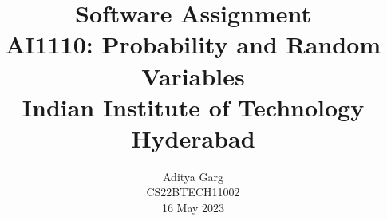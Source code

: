 \documentclass[journal,12pt,twocolumn]{IEEEtran}
\providecommand{\pr}[1]{\ensuremath{\Pr\left(#1\right)}}
\providecommand{\cbrak}[1]{\ensuremath{\left\{#1\right\}}}
\begin{document}
\newtheorem{theorem}{Theorem}[section]
\newtheorem{problem}{Problem}
\newtheorem{proposition}{Proposition}[section]
\newtheorem{lemma}{Lemma}[section]
\newtheorem{corollary}[theorem]{Corollary}
\newtheorem{example}{Example}[section]
\newtheorem{definition}[problem]{Definition}
\newcommand{\BEQA}{\begin{eqnarray}}
\newcommand{\EEQA}{\end{eqnarray}}
\newcommand{\define}{\stackrel{\triangle}{=}}



\providecommand{\mbf}{\mathbf}
\providecommand{\pr}[1]{\ensuremath{\Pr\left(#1\right)}}
\providecommand{\qfunc}[1]{\ensuremath{Q\left(#1\right)}}
\providecommand{\sbrak}[1]{\ensuremath{{}\left[#1\right]}}
\providecommand{\lsbrak}[1]{\ensuremath{{}\left[#1\right.}}
\providecommand{\rsbrak}[1]{\ensuremath{{}\left.#1\right]}}
\providecommand{\brak}[1]{\ensuremath{\left(#1\right)}}
\providecommand{\lbrak}[1]{\ensuremath{\left(#1\right.}}
\providecommand{\rbrak}[1]{\ensuremath{\left.#1\right)}}
\providecommand{\cbrak}[1]{\ensuremath{\left\{#1\right\}}}
\providecommand{\lcbrak}[1]{\ensuremath{\left\{#1\right.}}
\providecommand{\rcbrak}[1]{\ensuremath{\left.#1\right\}}}
\theoremstyle{remark}
\newtheorem{rem}{Remark}
\newcommand{\sgn}{\mathop{\mathrm{sgn}}}

\newcommand{\solution}{\noindent \textbf{Solution: }}
\newcommand{\cosec}{\,\text{cosec}\,}
\providecommand{\dec}[2]{\ensuremath{\overset{#1}{\underset{#2}{\gtrless}}}}
\newcommand{\myvec}[1]{\ensuremath{\begin{pmatrix}#1\end{pmatrix}}}
\newcommand{\mydet}[1]{\ensuremath{\begin{vmatrix}#1\end{vmatrix}}}
\newcommand{\xor}{\oplus}
\let\vec\mathbf


\vspace{3cm}

\title{
   Software Assignment \\ \Large AI1110: Probability and Random Variables \\ \large Indian Institute of Technology Hyderabad
}
\author{ Aditya Garg \\ CS22BTECH11002 \\ 16 May 2023	
	
}	
\maketitle
\newpage
\bigskip
\renewcommand{\thefigure}{\theenumi}
\renewcommand{\thetable}{\theenumi}
\renewcommand{\thetable}{\arabic{table}}  
\end{document}
